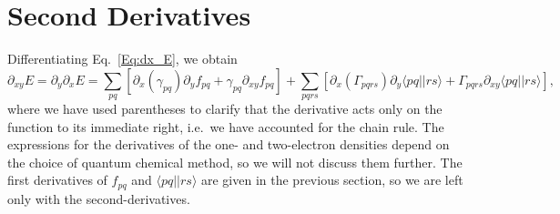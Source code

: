 \documentclass[12pt]{article}
\def\ket#1{| #1 \rangle}
\def\bra#1{\langle #1 |}
\def\aint#1#2{\bra{#1}\ket{#2}}
\begin{document}
\section{Second Derivatives}

\noindent
Differentiating Eq.~\eqref{Eq:dx_E}, we obtain
\begin{equation}
\partial_{xy} E = \partial_y \partial_x E = \sum_{pq} \left[ \partial_x (\gamma_{pq}) \partial_y f_{pq} + \gamma_{pq}
\partial_{xy} f_{pq} \right] + \sum_{pqrs} \left[ \partial_x (\Gamma_{pqrs}) \partial_y \aint{pq}{rs} + \Gamma_{pqrs}
\partial_{xy} \aint{pq}{rs} \right],
\end{equation}
where we have used parentheses to clarify that the derivative acts only on the function to its immediate right, i.e.\
we have accounted for the chain rule.  The expressions for the derivatives of the one- and two-electron densities depend
on the choice of quantum chemical method, so we will not discuss them further.  The first derivatives of $f_{pq}$ and
$\aint{pq}{rs}$ are given in the previous section, so we are left only with the second-derivatives.
\end{document}
